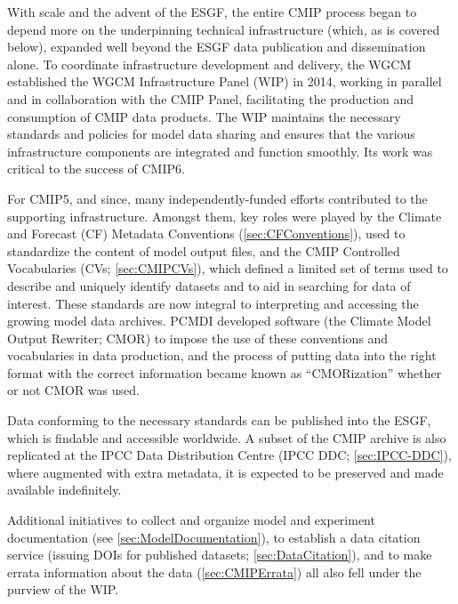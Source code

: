 \documentclass[manuscript]{copernicus}
\def\cred#1{{\color{red}#1}}
\begin{document}
With scale and the advent of the ESGF, the entire CMIP process began to depend more on the underpinning technical infrastructure (which, as is covered below), expanded well beyond the ESGF data publication and dissemination alone. To coordinate infrastructure development and delivery, the WGCM established the WGCM Infrastructure Panel (WIP) in 2014, working in parallel and in collaboration with the CMIP Panel, facilitating the production and consumption of CMIP data products. The WIP maintains the necessary standards and policies for model data sharing and ensures that the various infrastructure components are integrated and function smoothly. Its work was critical to the success of CMIP6.

For CMIP5, and since, many independently-funded efforts contributed to the supporting infrastructure. Amongst them, key roles were played by the Climate and Forecast (CF) Metadata Conventions (\autoref{sec:CFConventions}), used to standardize the content of model output files, and the CMIP Controlled Vocabularies (CVs; \autoref{sec:CMIPCVs}), which defined a limited set of terms used to describe and uniquely identify datasets and to aid in searching for data of interest. These standards are now integral to interpreting and accessing the growing model data archives. PCMDI developed software (the Climate Model Output Rewriter; CMOR) to impose the use of these conventions and vocabularies in data production, and the process of putting data into the right format with the correct information became known as ``CMORization'' whether or not CMOR was used. 

Data conforming to the necessary standards can be published into the ESGF, which is findable and accessible worldwide. A subset of the CMIP archive is also replicated at the IPCC Data Distribution Centre (IPCC DDC; \autoref{sec:IPCC-DDC}), where augmented with extra metadata, it is expected to be preserved and made available indefinitely. 

Additional initiatives to collect and organize model and experiment documentation (see \autoref{sec:ModelDocumentation}), to establish a data citation service (issuing DOIs for published datasets; \autoref{sec:DataCitation}), and to make errata information about the data (\autoref{sec:CMIPErrata}) all also fell under the purview of the WIP.

\end{document}
